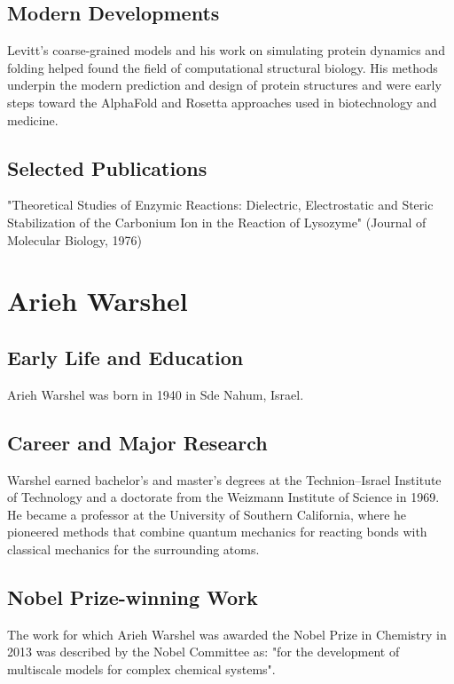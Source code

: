 \subsection*{Modern Developments}

Levitt's coarse-grained models and his work on simulating protein dynamics and folding helped found the field of computational structural biology. His methods underpin the modern prediction and design of protein structures and were early steps toward the AlphaFold and Rosetta approaches used in biotechnology and medicine.

\subsection*{Selected Publications}

"Theoretical Studies of Enzymic Reactions: Dielectric, Electrostatic and Steric Stabilization of the Carbonium Ion in the Reaction of Lysozyme" (Journal of Molecular Biology, 1976)

\clearpage

\section{Arieh Warshel}

\subsection*{Early Life and Education}

Arieh Warshel was born in 1940 in Sde Nahum, Israel.

\subsection*{Career and Major Research}

Warshel earned bachelor's and master's degrees at the Technion--Israel Institute of Technology and a doctorate from the Weizmann Institute of Science in 1969. He became a professor at the University of Southern California, where he pioneered methods that combine quantum mechanics for reacting bonds with classical mechanics for the surrounding atoms.

\subsection*{Nobel Prize-winning Work}

The work for which Arieh Warshel was awarded the Nobel Prize in Chemistry in 2013 was described by the Nobel Committee as: "for the development of multiscale models for complex chemical systems".

